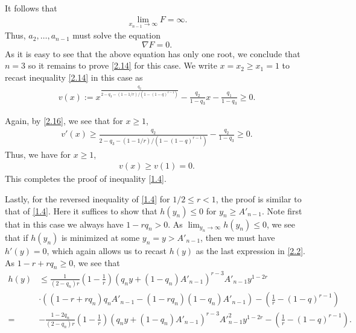 \documentclass[11pt]{amsart}
\numberwithin{equation}{section}
\theoremstyle{definition}
\theoremstyle{remark}
\begin{document}
   It follows that
\begin{align*}
  \lim_{x_{n-1} \rightarrow \infty}F=\infty.
\end{align*}
   Thus, $a_2, \ldots, a_{n-1}$ must solve the equation
\begin{equation*}
    \nabla F=0.
\end{equation*}
   As it is easy to see that the above equation has only one root, we conclude that $n=3$ so it remains to prove \eqref{2.14} for this case. We write $x=x_2 \geq x_1=1$ to recast inequality \eqref{2.14} in this case as
\begin{align*}
  v(x) :=x^{\frac {q_2}{2-q_3-(1-1/r)/(1-(1-q)^{r-1})}} -\frac {q_2}{1-q_3}x-\frac {q_1}{1-q_3} \geq 0.
\end{align*}

   Again, by \eqref{2.16}, we see that for $x \geq 1$,
\begin{align*}
   v'(x) \geq \frac {q_2}{2-q_3-(1-1/r)/(1-(1-q)^{r-1})}-\frac {q_2}{1-q_3} \geq 0.
\end{align*}
   Thus, we have for $x \geq 1$,
\begin{align*}
  v(x) \geq v(1)=0.
\end{align*}
  This completes the proof of inequality \eqref{1.4}.

   Lastly, for the reversed inequality of \eqref{1.4} for $1/2 \leq r <1$, the proof is similar to that of \eqref{1.4}. Here it suffices to show that $h(y_n) \leq 0$ for $y_n \geq A'_{n-1}$.  Note first that in this case we always have $1-rq_n >0$. As $\lim_{y_n \rightarrow \infty}h(y_n) \leq 0$, we see that if $h(y_n)$ is minimized at some $y_n=y > A'_{n-1}$, then we must have $h'(y)=0$, which again allows us to recast $h(y)$ as the last expression in \eqref{2.2}. As $1-r+rq_n \geq 0$, we see that
\begin{align*}
    h(y) & \leq  \frac 1{(2-q_n)r}(1-\frac {1}{r})(q_ny+(1-q_n)A'_{n-1})^{r-3}A'_{n-1}y^{1-2r} \\
    & \cdot \left ( \left (1-r+rq_n\right)q_nA'_{n-1}- \left (1-rq_n \right)\left (1-q_n \right)A'_{n-1} \right ) -(\frac 1r-(1-q)^{r-1}) \\
=& -\frac {1-2q_n}{(2-q_n)r}(1-\frac {1}{r})(q_ny+(1-q_n)A'_{n-1})^{r-3}{A'}^2_{n-1}y^{1-2r} -(\frac 1r-(1-q)^{r-1}).
\end{align*}
\end{document}
